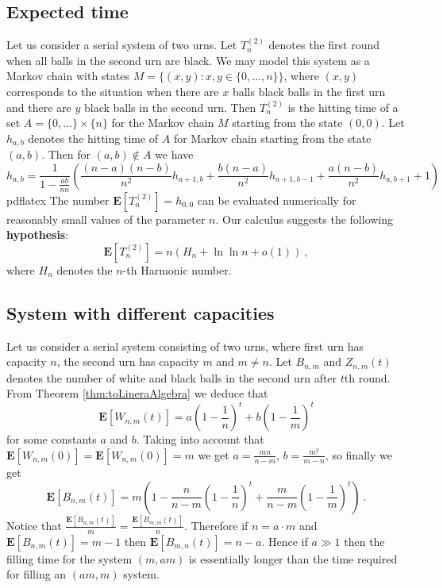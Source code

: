\documentclass[submission]{dmtcs}
\newcommand{\E}[1]{\mathbf{E}\left[#1\right]}
\begin{document}
\subsection{Expected time}

Let us consider a serial system of two urns. 
Let $T_n^{(2)}$ denotes the first round 
when all balls in the second urn are black. 
We may model  this system as a Markov chain with states 
$M = \{(x,y):x,y \in \{0,\ldots,n\}\}$, where $(x,y)$ corresponds to the 
situation when there are $x$ balls black balls in the first urn 
and there are $y$ black balls in the second urn. Then
$T_n^{(2)}$ is the hitting time of a set $A = \{0,\ldots\}\times \{n\}$  for the
Markov chain $M$ starting from the state $(0,0)$.
Let $h_{a,b}$ denotes the hitting time of $A$ for Markov chain starting 
from the state $(a,b)$. Then for $(a,b) \notin A$ we have
$$
h_{a,b} = 
\frac{1}{1-\frac{a b}{n n}}
\left(\frac{(n-a) (n-b)}{n^2}  h_{a+1,b} +
\frac{b (n-a)}{n^2}  h_{a+1,b-1} +
\frac{a (n-b)}{n^2}  h_{a,b+1}+
1\right)
$$
pdflatex
The number $\E{T_n^{(2)}} = h_{0,0}$ can be evaluated numerically for reasonably small 
values of the parameter $n$. Our calculus suggests the following 
\textbf{hypothesis}:
$$
  \E{T_n^{(2)}} = n(H_n + \ln\ln n + o(1))~,
$$
where $H_n$ denotes the $n$-th Harmonic number. 

\subsection{System with different capacities}
\label{sec:differentSerial}
Let us consider a serial system consisting of two urns, where first urn has 
capacity $n$, the second urn has capacity $m$ and $m\neq n$.
Let $B_{n,m}$ and  $Z_{n,m}(t)$ denotes the number of white and black balls 
in the second urn after  $t$th round. 
From Theorem \ref{thm:toLineraAlgebra} we deduce that
$$ 
\E{W_{n,m}(t)} = a\left(1-\frac1n\right)^t + b\left(1-\frac1m\right)^t
$$
for some constants $a$ and $b$. Taking into account that 
$\E{W_{n,m}(0)} = \E{W_{n,m}(0)} = m$ we get
$a = \frac{m n}{n-m}$, $b = \frac{m^2}{m-n}$, so finally we get
$$
  \E{B_{n,m}(t)} = 
	m\left(1 - 
	\frac{n}{n-m}\left(1-\frac{1}{n}\right)^t +
	\frac{m}{n-m}\left(1-\frac{1}{m}\right)^t
	\right)~.
$$
Notice that $\frac{\E{B_{n,m}(t)}}{m} = \frac{\E{B_{m,m}(t)}}{n}$.
Therefore if $n = a\cdot m$ and $\E{B_{n,m}(t)} = m-1$ then
$\E{B_{m,n}(t)} = n-a$. Hence if $a \gg 1$ then the filling time for the system 
$(m,am)$ is essentially longer than the time required for filling 
an $(am,m)$ system.
\end{document}
